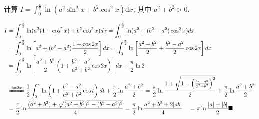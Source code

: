 \documentclass[lang=cn,newtx,10pt,scheme=chinese]{elegantbook}
\begin{document}
\begin{example}
计算 $I = \int_{0}^{\frac{\pi}{2}} \ln(a^2\sin^2x+b^2\cos^2x)\mathrm{d} x$, 其中 $a^2+b^2 > 0$.
\end{example}

\begin{solution}
\begin{align*}
I &= \int_{0}^{\frac{\pi}{2}} \ln(a^2(1-\cos^2x)+b^2\cos^2x)dx = \int_{0}^{\frac{\pi}{2}} \ln(a^2+(b^2-a^2)\cos^2x)dx \\
&= \int_{0}^{\frac{\pi}{2}} \ln\left[a^2+(b^2-a^2)\frac{1+\cos 2x}{2}\right]dx = \int_{0}^{\frac{\pi}{2}} \ln\left[\frac{a^2+b^2}{2}+\frac{b^2-a^2}{2}\cos 2x\right]dx \\
&= \int_{0}^{\frac{\pi}{2}} \ln\left[\frac{a^2+b^2}{2}\left(1+\frac{b^2-a^2}{a^2+b^2}\cos 2x\right)\right]dx + \frac{\pi}{2}\ln 2 \\
&\xlongequal{t=2x} \frac{1}{2}\int_{0}^{\pi}\ln\left(1+\frac{b^2-a^2}{a^2+b^2}\cos t\right)dt + \frac{\pi}{2}\ln\frac{a^2+b^2}{2} = \frac{\pi}{2}\ln\frac{1+\sqrt{1-\left(\frac{b^2-a^2}{a^2+b^2}\right)^2}}{2} + \frac{\pi}{2}\ln\frac{a^2+b^2}{2} \\
&= \frac{\pi}{2}\ln\frac{(a^2+b^2)+\sqrt{(a^2+b^2)^2-(b^2-a^2)^2}}{4} = \frac{\pi}{2}\ln\frac{a^2+b^2+2|ab|}{4} \quad = \pi\ln\frac{|a|+|b|}{2} \blacksquare
\end{align*}
\end{solution}
\end{document}
